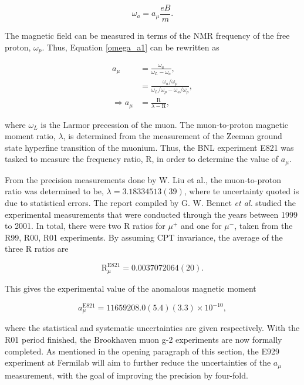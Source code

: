 \documentclass{article}
\numberwithin{equation}{section} %
\begin{document}
\begin{equation}
\omega_a=a_\mu\frac{eB}{m}.
\label{omega_a1}
\end{equation}

The magnetic field can be measured in terms of the NMR frequency of the free proton, $\omega_p$. Thus, Equation \ref{omega_a1} can be rewritten as

\begin{equation}
\begin{split}
a_\mu &= \frac{\omega_a}{\omega_L-\omega_a},\\
&= \frac{\omega_a/\omega_p}{\omega_L/\omega_p-\omega_a/\omega_p},\\
\Rightarrow a_\mu&= \frac{\mathrm{R}}{\lambda-\mathrm{R}},
\end{split}
\end{equation}

\noindent where $\omega_L$ is the Larmor precession of the muon. The muon-to-proton magnetic moment ratio, $\lambda$, is determined from the measurement of the Zeeman ground state hyperfine transition of the muonium\cite{muon_hyperfine}. Thus, the BNL experiment E821 was tasked to measure the frequency ratio, R, in order to determine the value of $a_\mu$.

From the precision measurements done by W. Liu et al.\cite{muon_hyperfine}, the muon-to-proton ratio was determined to be, $\lambda =3.183 345 13(39)$, where te uncertainty quoted is due to statistical errors. The report compiled by G. W. Bennet \textit{et al.}\cite{bnl} studied the experimental measurements that were conducted through the years between 1999 to 2001. In total, there were two R ratios for $\mu^+$ and one for $\mu^-$, taken from the R99, R00, R01 experiments. By assuming CPT invariance, the average of the three R ratios are

\begin{equation}
\mathrm{R}_\mu^{\mathrm{E821}} = 0.003 707 206 4(2 0).
\end{equation}

\noindent This gives the experimental value of the anomalous magnetic moment\cite{millerg2}

\begin{equation}
a_\mu^{\mathrm{E821}} = 11 659 208.0(5.4)(3.3) \times 10^{-10},
\label{a_mu exp}
\end{equation}

\noindent where the statistical and systematic uncertainties are given respectively. With the R01 period finished, the Brookhaven muon g-2 experiments are now formally completed. As mentioned in the opening paragraph of this section, the E929 experiment at Fermilab will aim to further reduce the uncertainties of the $a_\mu$ measurement, with the goal of improving the precision by four-fold\cite{fermilab}.
\end{document}
